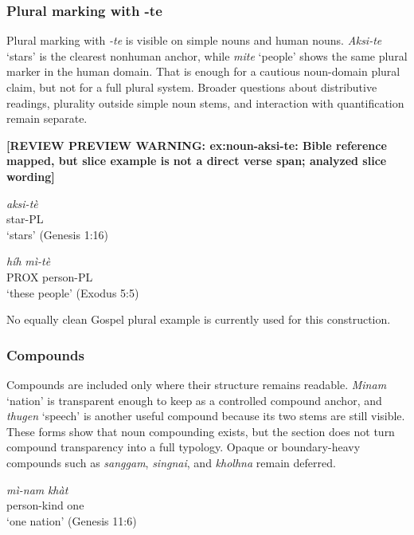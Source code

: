 \documentclass[
  11pt,
  a4paper,
]{article}
\newcommand{\tdim}[1]{\textit{#1}}
\newcommand{\tdimword}[1]{\textit{#1}}
\renewcommand{\textsc}[1]{{\footnotesize\MakeUppercase{#1}}}
\newcommand{\glossquote}[1]{`#1'}
\newcommand{\reviewwarninginline}[1]{\textbf{#1}\par\smallskip}
\begin{document}
\subsubsection{Plural marking with -te}\label{plural-marking-with--te}

Plural marking with \tdim{-te} is visible on simple nouns and human
nouns. \tdim{Aksi-te} \glossquote{stars} is the clearest nonhuman
anchor, while \tdim{mite} \glossquote{people} shows the same plural
marker in the human domain. That is enough for a cautious noun-domain
plural claim, but not for a full plural system. Broader questions about
distributive readings, plurality outside simple noun stems, and
interaction with quantification remain separate.

\begin{exe}
\ex \label{ex:noun-aksi-te}
\reviewwarninginline{[REVIEW PREVIEW WARNING: ex:noun-aksi-te: Bible reference mapped, but slice example is not a direct verse span; analyzed slice wording]}
\gll \tdimword{aksi-tè} \\
     star-\textsc{pl} \\
\glt \glossquote{stars} (Genesis 1:16)
\end{exe}

\begin{exe}
\ex \label{ex:noun-hih-mite}
\gll \tdimword{híh} \tdimword{mì-tè} \\
     \textsc{prox} person-\textsc{pl} \\
\glt \glossquote{these people} (Exodus 5:5)
\end{exe}

No equally clean Gospel plural example is currently used for this
construction.

\subsubsection{Compounds}\label{compounds}

Compounds are included only where their structure remains readable.
\tdim{Minam} \glossquote{nation} is transparent enough to keep as a
controlled compound anchor, and \tdim{thugen} \glossquote{speech} is
another useful compound because its two stems are still visible. These
forms show that noun compounding exists, but the section does not turn
compound transparency into a full typology. Opaque or boundary-heavy
compounds such as \tdim{sanggam}, \tdim{singnai}, and \tdim{kholhna}
remain deferred.

\begin{exe}
\ex \label{ex:noun-minam-khat}
\gll \tdimword{mì-nam} \tdimword{khàt} \\
     person-kind one \\
\glt \glossquote{one nation} (Genesis 11:6)
\end{exe}
\end{document}
